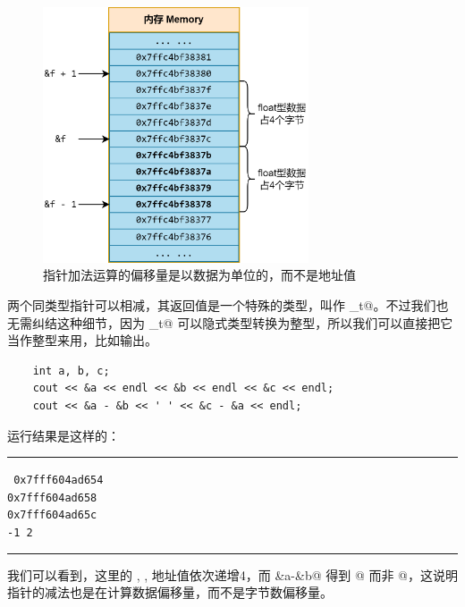 \begin{figure}[htbp]
    \centering
    \includegraphics[width=0.7\textwidth]{../images/generalized_parts/05_arithmetic_of_pointer_300.png}
    \caption{指针加法运算的偏移量是以数据为单位的，而不是地址值}
\end{figure}
两个同类型指针可以相减，其返回值是一个特殊的类型，叫作 \lstinline@ptrdiff_t@。不过我们也无需纠结这种细节，因为 \lstinline@ptrdiff_t@ 可以隐式类型转换为整型，所以我们可以直接把它当作整型来用，比如输出。
\begin{lstlisting}
    int a, b, c;
    cout << &a << endl << &b << endl << &c << endl;
    cout << &a - &b << ' ' << &c - &a << endl;
\end{lstlisting}
运行结果是这样的：\\\noindent\rule{\linewidth}{0.2pt}\texttt{
0x7fff604ad654\\
0x7fff604ad658\\
0x7fff604ad65c\\
-1 2
}\\\noindent\rule{\linewidth}{0.2pt}
我们可以看到，这里的 \lstinline@a@, \lstinline@b@, \lstinline@c@ 地址值依次递增4，而 \lstinline@&a-&b@ 得到 @ 而非 @，这说明指针的减法也是在计算数据偏移量，而不是字节数偏移量。\par
